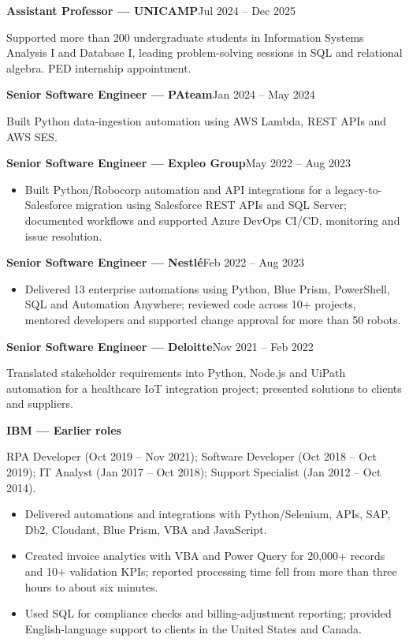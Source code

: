 \documentclass[10pt,a4paper]{article}
\newcommand{\role}[3]{\textbf{#1 --- #2}\hfill {\small #3}\par}
\begin{document}
\role{Assistant Professor}{UNICAMP}{Jul 2024 -- Dec 2025}
Supported more than 200 undergraduate students in Information Systems Analysis I and Database I, leading problem-solving sessions in SQL and relational algebra. PED internship appointment.

\role{Senior Software Engineer}{PAteam}{Jan 2024 -- May 2024}
Built Python data-ingestion automation using AWS Lambda, REST APIs and AWS SES.\par
\vspace{2pt}
\role{Senior Software Engineer}{Expleo Group}{May 2022 -- Aug 2023}
\begin{itemize}
  \item Built Python/Robocorp automation and API integrations for a legacy-to-Salesforce migration using Salesforce REST APIs and SQL Server; documented workflows and supported Azure DevOps CI/CD, monitoring and issue resolution.
\end{itemize}
\vspace{1pt}
\role{Senior Software Engineer}{Nestl\'e}{Feb 2022 -- Aug 2023}
\begin{itemize}
  \item Delivered 13 enterprise automations using Python, Blue Prism, PowerShell, SQL and Automation Anywhere; reviewed code across 10+ projects, mentored developers and supported change approval for more than 50 robots.
\end{itemize}
\vspace{1pt}
\role{Senior Software Engineer}{Deloitte}{Nov 2021 -- Feb 2022}
Translated stakeholder requirements into Python, Node.js and UiPath automation for a healthcare IoT integration project; presented solutions to clients and suppliers.\par
\vspace{2pt}
\textbf{IBM --- Earlier roles}\par
RPA Developer (Oct 2019 -- Nov 2021); Software Developer (Oct 2018 -- Oct 2019); IT Analyst (Jan 2017 -- Oct 2018); Support Specialist (Jan 2012 -- Oct 2014).\par
\begin{itemize}
  \item Delivered automations and integrations with Python/Selenium, APIs, SAP, Db2, Cloudant, Blue Prism, VBA and JavaScript.
  \item Created invoice analytics with VBA and Power Query for 20,000+ records and 10+ validation KPIs; reported processing time fell from more than three hours to about six minutes.
  \item Used SQL for compliance checks and billing-adjustment reporting; provided English-language support to clients in the United States and Canada.
\end{itemize}
\end{document}
